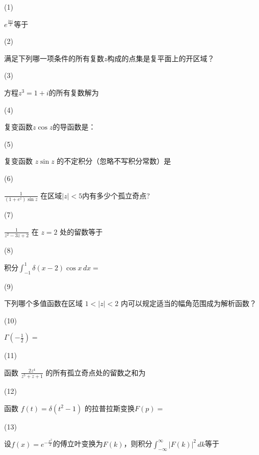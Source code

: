 \documentclass[CJK]{article}
\begin{document}
\bitem
\item[(1)]{$e^{\frac{3\pi i}{2}}$等于 

}
\item[(2)]{满足下列哪一项条件的所有复数$z$构成的点集是复平面上的开区域？

}
\item[(3)]{方程$z^3=1+i$的所有复数解为 

}
\item[(4)]{复变函数$z\cos z$的导函数是：
  
  }
\item[(5)]{复变函数 $z\sin z$ 的不定积分（忽略不写积分常数）是 
  
   }
\item[(6)]{$\frac{1}{(1+e^z)\sin z}$ 在区域$|z|< 5 $内有多少个孤立奇点? 
  
  }
\item[(7)]{$\frac{1}{z^2-3z+2}$ 在 $z=2$ 处的留数等于 

    }  
\item[(8)]{积分$\int_{-1}^1 \delta(x-2) \cos x\, dx =$

    }  
\item[(9)]{下列哪个多值函数在区域 $1<|z|<2$ 内可以规定适当的幅角范围成为解析函数？ 

  }
\item[(10)]{$\Gamma(- \frac{1}{2}) = $ 

  }
\item[(11)]{函数 $\frac{2z^4}{z^{5}+z+1}$ 的所有孤立奇点处的留数之和为 

    }  
\item[(12)]{函数 $f(t) = \delta(t^2-1)$ 的拉普拉斯变换$F(p)=$ 

  }
\item[(13)]{设$f(x) = e^{-\frac{x^2}{2}}$的傅立叶变换为$F(k)$，则积分$\int_{-\infty}^\infty \left\vert F(k)\right\vert^2\,dk$等于

}
\end{document}
